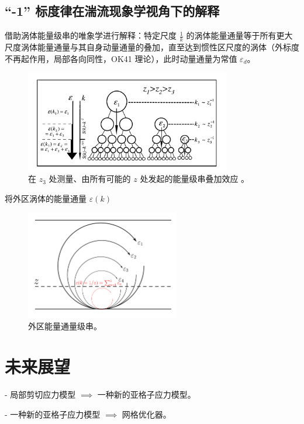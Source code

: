 \documentclass[10pt]{article}
\begin{document}
\subsection{“-1” 标度律在湍流现象学视角下的解释}
\citet{nikora1999prl} 借助涡体能量级串的唯象学进行解释：特定尺度 $\frac{1}{k}$ 的涡体能量通量等于所有更大尺度涡体能量通量与其自身动量通量的叠加，直至达到惯性区尺度的涡体（外标度不再起作用，局部各向同性，OK41 理论），此时动量通量为常值 $\varepsilon_d$。
\begin{figure}[htpb]
    \centering
    \includegraphics[width=0.8\textwidth]{./figures/energy-cascade.png}
    \caption{在 $z_3$ 处测量、由所有可能的 $z$ 处发起的能量级串叠加效应 \cite{nikora1999prl}。}
    \label{fig:-figures-energy-cascade-png}
\end{figure}
将外区涡体的能量通量 $\varepsilon(k)$
\begin{figure}[htpb]
    \centering
    \includegraphics[width=0.6\textwidth]{./figures/cascade.pdf}
    \caption{外区能量通量级串。}
    \label{fig:-figures-cascade-pdf}
\end{figure}

\section{未来展望}

    
- 局部剪切应力模型 $\implies$ 一种新的亚格子应力模型。
    
- 一种新的亚格子应力模型 $\implies$ 网格优化器。


\printbibliography[heading=bibintoc, title={参考文献}]
\end{document}
